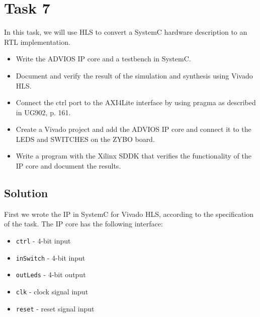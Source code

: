 \documentclass[../main.tex]{subfiles}
\begin{document}
\section{Task 7}

In this task, we will use HLS to convert a SystemC hardware description to an RTL implementation.

\begin{itemize}
    \item Write the ADVIOS IP core and a testbench in SystemC.
    \item Document and verify the result of the simulation and synthesis using Vivado HLS.
    \item Connect the ctrl port to the AXI4Lite interface by using pragma as described in UG902, p. 161.
    \item Create a Vivado project and add the ADVIOS IP core and connect it to the LEDS and SWITCHES on the ZYBO board.
    \item Write a program with the Xilinx SDDK that verifies the functionality of the IP core and document the results.
\end{itemize}

\subsection*{Solution}

First we wrote the IP in SystemC for Vivado HLS, according to the specification of the task. 
The IP core has the following interface:
\begin{itemize}
    \item \texttt{ctrl} - 4-bit input
    \item \texttt{inSwitch} - 4-bit input
    \item \texttt{outLeds} - 4-bit output
    \item \texttt{clk} - clock signal input
    \item \texttt{reset} - reset signal input
\end{itemize}
\end{document}
